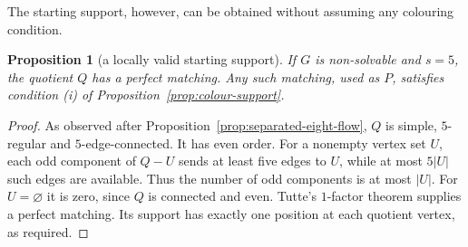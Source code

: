 \documentclass[11pt,a4paper]{article}
\newtheorem{proposition}[theorem]{Proposition}
\theoremstyle{definition}
\theoremstyle{remark}
\begin{document}
The starting support, however, can be obtained without assuming any colouring condition.
\begin{proposition}[a locally valid starting support]\label{prop:starting-support}
If $G$ is non-solvable and $s=5$, the quotient $Q$ has a perfect matching.  Any such matching, used as $P$, satisfies condition \textup{(i)} of Proposition~\ref{prop:colour-support}.
\end{proposition}
\begin{proof}
As observed after Proposition~\ref{prop:separated-eight-flow}, $Q$ is simple, $5$-regular and $5$-edge-connected.  It has even order.  For a nonempty vertex set $U$, each odd component of $Q-U$ sends at least five edges to $U$, while at most $5|U|$ such edges are available.  Thus the number of odd components is at most $|U|$.  For $U=\varnothing$ it is zero, since $Q$ is connected and even.  Tutte's $1$-factor theorem \cite{Tutte47} supplies a perfect matching.  Its support has exactly one position at each quotient vertex, as required.
\end{proof}
\end{document}
